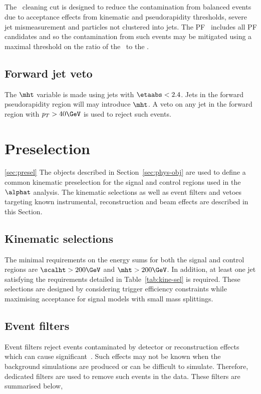 \subsection{\mhtmet}
The \mhtmet~cleaning cut is designed to reduce the contamination from balanced events
due to acceptance effects from kinematic and pseudorapidity thresholds, 
severe jet mismeasurement and particles not clustered into jets. The PF \met~includes
all PF candidates and so the contamination from such events may be mitigated 
using a maximal threshold on the ratio of the \mht~to the \met.
\subsection{Forward jet veto}
\label{sec:fwd_jet_veto}
The $\mht$ variable is made using jets with $\etaabs < 2.4$. Jets in the forward pseudorapidity 
region will may introduce $\mht$. A veto on any jet in the forward region with $p_T > 40\GeV$
is used to reject such events. 



\section{Preselection}
\ref{sec:presel}
The objects described in Section~\ref{sec:phys-obj} are used to define a common kinematic 
preselection for the signal and control regions used in the $\alphat$ analysis. 
The kinematic selections as well as event filters and vetoes targeting
known instrumental, reconstruction and beam effects are described in this Section.

\subsection{Kinematic selections}
The minimal requirements on the energy sums for both the signal and control regions are
$\scalht > 200\GeV$ and $\mht > 200\GeV$. In addition, at least one jet satisfying the 
requirements detailed in Table~\ref{tab:kine-sel} is required. These selections are 
designed by considering trigger efficiency constraints while maximising acceptance for
signal models with small mass splittings.
\subsection{Event filters}
\label{sec:event_filters}
Event filters reject events contaminated by detector or reconstruction effects
which can cause significant~\met. Such effects may not be known when the 
background simulations are produced or can be difficult to simulate. Therefore,
dedicated filters are used to remove such events in the data. These \met filters are summarised below,

